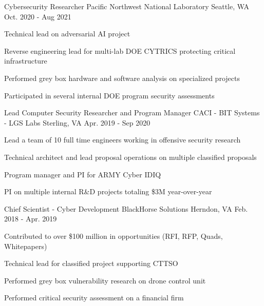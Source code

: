 \begin{cventries}
\vspace{1em}

  \cventry
    {Cybersecurity Researcher} %
    {Pacific Northwest National Laboratory} %
    {Seattle, WA} %
    {Oct. 2020 - Aug 2021} %
   {
      \begin{cvitems} %
        \item {Technical lead on adversarial AI project}
        \item {Reverse engineering lead for multi-lab DOE CYTRICS protecting critical infrastructure}
        \item {Performed grey box hardware and software analysis on specialized projects}
        \item {Participated in several internal DOE program security assessments}
      \end{cvitems}
    }

\vspace{1em}

  \cventry
    {Lead Computer Security Researcher and Program Manager} %
    {CACI - BIT Systems - LGS Labs} %
    {Sterling, VA} %
    {Apr. 2019 - Sep 2020} %
   {
      \begin{cvitems} %
        \item {Lead a team of 10 full time engineers working in offensive security research}
        \item {Technical architect and lead proposal operations on multiple classified proposals}
        \item {Program manager and PI for ARMY Cyber IDIQ}
        \item {PI on multiple internal R\&D projects totaling \$3M year-over-year}
      \end{cvitems}
    }

\vspace{1em}
  \cventry
    {Chief Scientist - Cyber Development} %
    {BlackHorse Solutions} %
    {Herndon, VA} %
    {Feb. 2018 - Apr. 2019} %
  {
    \begin{cvitems} %
      \item {Contributed to over \$100 million in opportunities (RFI, RFP, Quads, Whitepapers)}
      \item {Technical lead for classified project supporting CTTSO}
      \item {Performed grey box vulnerability research on drone control unit}
      \item {Performed critical security assessment on a financial firm}
    \end{cvitems}
  }


\end{cventries}
